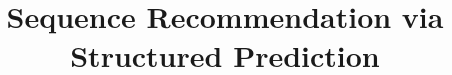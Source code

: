 \documentclass[letterpaper]{article} %
\title{Sequence Recommendation via Structured Prediction}
\newcommand{\eqmoveup}{\vspace{-1.0mm}}                 %
\newcommand{\captionmoveup}{\eqmoveup\vspace{-2.80mm}}   %
\begin{document}
\maketitle

\begin{abstract}

\end{abstract}




%


%


%





\clearpage
\onecolumn

\end{document}
